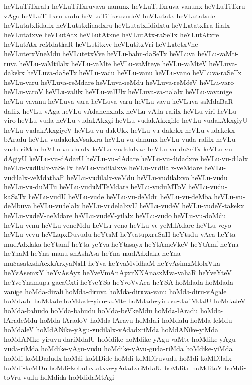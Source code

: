 {heVLuTiTxralu
heVLuTiTxruvava-nanunx
heVLuTiTxruva-vanunx
heVLuTiTxru-vAga
heVLuTiTxru-vudu
heVLuTiTxruvudeV
heVLutatx
heVLutatxde
heVLutatxlidadx
heVLutatxlidadxru
heVLutatxlididxtu
heVLutatxlira-lilalx
heVLutatxve
heVLutAtx
heVLutAtxne
heVLutAtx-raSeTx
heVLutAtxre
heVLutAtx-reMdathaR
heVLutitxve
heVLutitxVri
heVLutetxVne
heVLutetxVneMdu
heVLutetxVve
heVLu-bahu-daSeTx
heVLuva
heVLu-vaMti-ruva
heVLu-vaMtilalx
heVLu-vaMte
heVLu-vaMteye
heVLu-vaMteV
heVLuva-dakekx
heVLuva-daSeTx
heVLu-vadu
heVLu-vanu
heVLu-vano
heVLuva-raSeTx
heVLu-varu
heVLuva-reMdare
heVLuva-reMdu
heVLuva-reMdeV
heVLu-varo
heVLu-varoV
heVLu-valilx
heVLu-valUlx
heVLuva-va-nalalx
heVLu-vavanige
heVLu-vavanu
heVLuva-vara
heVLuva-varu
heVLu-vavu
heVLuva-saMdaBaR-dalilx
heVLu-vAga
heVLu-vAdanenxlalx
heVLu-vAda-ralilx
heVLu-viri
heVLu-viro
heVLu-vuda
heVLu-vudakAkxgi
heVLu-vudakAkxgide
heVLu-vudakAkxgiyU
heVLu-vudakAkxgiyeV
heVLu-vu-dakUkx
heVLu-vu-dakekx
heVLu-vudakekx-bAradu
heVLu-vudakokxVsakxra
heVLu-vu-danunx
heVLu-vuda-ralilx
heVLu-vuda-riMda
heVLu-vu-dalalx
heVLu-vudalalxve
heVLu-vu-daSeTx
heVLu-vu-dAgiyU
heVLu-vu-dAdarU
heVLu-vu-dAdare
heVLu-vu-didadxre
heVLu-vu-dilalx
heVLu-vudilalx-vaSeTx
heVLu-vudilalxve
heVLu-vudilalx-veMdare
heVLu-vudilalx-veMdathaR
heVLu-vudilalx-veMdu
heVLu-vudilalxvo
heVLu-vudu
heVLu-vu-duMTu
heVLu-vuduMTeMdare
heVLu-vuduMToV
heVLu-vudu-kaSaTx
heVLu-vudU
heVLu-vude
heVLu-vu-deMdu
heVLu-vu-deMba
heVLu-vu-deMbuva
heVLu-vudelalx
heVLu-vudelalxvU
heVLu-vudeV
heVLu-vudeV-takekx
heVLu-vudeV-neMdare
heVLu-vudeV-yilalx
heVLu-vudo
heVLu-vu-doMdu
heVLu-venu
heVLu-veneMdu
heVLu-veno
heVLu-ve-yeMdAdare
heVLu-veyo
heVLu-vevu
heVLapxDuvudu
heYtaM
heYtatupxruSaH
heYtadu-vAca
heYta-mudAdxlaka
heYtamf
heYta-yeYva
heYtasayx
heYtAmeVkeV
heYtAmf
heYna
heYnaM
heYna-manu-shAshAsa
heYna-mudAdxlaka
heYna-muSasatxshAcxkArxyaNaH
heYva
heYvaMvidhaM
heYvAsimxMlolxVka
heYvAsemxY
heYvAsAyx
heYveVmAnApxrXNAnasxMva-vahaR
heYveYteV
heYveYnamupa-gacaCxti
heYveYSa
heYvoVvAca
heYSA
hoMdada
hoMdada-vanige
hoMda-dirali
hoMda-diruva
hoMda-diruva-vanu
hoMda-diru-vAgale
hoMdadu
hoMdade
hoMdade-yiru-vaMte
hoMdade-yiruvu-dariMdalU
hoMdadeV
hoMda-bahudo
hoMda-bahudu
hoMda-beVkeMdu
hoMda-lAradu
hoMda-lAradeMdu
hoMda-lAradoV
hoMda-lAravu
hoMdali
hoMdalu
hoMda-leMdu
hoMdaleV
hoMdANike-yAgu-vudilalx-vAdadxriMda
hoMdANike-yiMda
hoMdANike-yiruvu-dariMdalU
hoMdike
hoMdike-yAgu-vaMte
hoMdike-yAgu-vuda-riMda
hoMdike-yAgu-vudu
hoMdike-yAvu-guda-riMda
hoMdike-yiMda
hoMdi-koMDadudx
hoMdi-koMDide
hoMdi-koMDiruvudu
hoMdi-koMDilalx
hoMdi-koMDu
hoMdi-koLuLxtatxve-yAdadxriMdalU
hoMditu
hoMditoV
hoMdi-toVru-vudu
hoMdida
hoMdidaMtAgi
}
